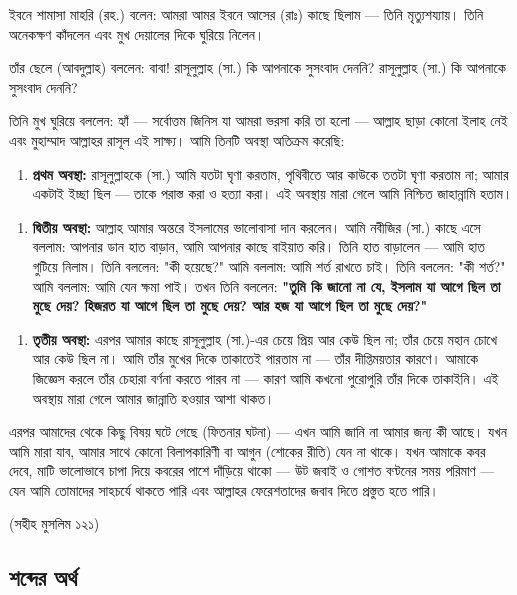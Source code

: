 ইবনে শামাসা মাহরি (রহ.) বলেন: আমরা আমর ইবনে আসের (রাঃ) কাছে ছিলাম — তিনি মৃত্যুশয্যায়। তিনি অনেকক্ষণ কাঁদলেন এবং মুখ দেয়ালের দিকে ঘুরিয়ে নিলেন।

তাঁর ছেলে (আবদুল্লাহ) বললেন: বাবা! রাসূলুল্লাহ (সা.) কি আপনাকে সুসংবাদ দেননি? রাসূলুল্লাহ (সা.) কি আপনাকে সুসংবাদ দেননি?

তিনি মুখ ঘুরিয়ে বললেন: হ্যাঁ — সর্বোত্তম জিনিস যা আমরা ভরসা করি তা হলো — আল্লাহ ছাড়া কোনো ইলাহ নেই এবং মুহাম্মাদ আল্লাহর রাসূল এই সাক্ষ্য। আমি তিনটি অবস্থা অতিক্রম করেছি:

\begin{enumerate}
\item \textbf{প্রথম অবস্থা:} রাসূলুল্লাহকে (সা.) আমি যতটা ঘৃণা করতাম, পৃথিবীতে আর কাউকে ততটা ঘৃণা করতাম না; আমার একটাই ইচ্ছা ছিল — তাকে পরাস্ত করা ও হত্যা করা। এই অবস্থায় মারা গেলে আমি নিশ্চিত জাহান্নামি হতাম।
\end{enumerate}
\begin{enumerate}
\item \textbf{দ্বিতীয় অবস্থা:} আল্লাহ আমার অন্তরে ইসলামের ভালোবাসা দান করলেন। আমি নবীজির (সা.) কাছে এসে বললাম: আপনার ডান হাত বাড়ান, আমি আপনার কাছে বাইয়াত করি। তিনি হাত বাড়ালেন — আমি হাত গুটিয়ে নিলাম। তিনি বললেন: "কী হয়েছে?" আমি বললাম: আমি শর্ত রাখতে চাই। তিনি বললেন: "কী শর্ত?" আমি বললাম: আমি যেন ক্ষমা পাই। তখন তিনি বললেন: \textbf{"তুমি কি জানো না যে, ইসলাম যা আগে ছিল তা মুছে দেয়? হিজরত যা আগে ছিল তা মুছে দেয়? আর হজ যা আগে ছিল তা মুছে দেয়?"}
\end{enumerate}
\begin{enumerate}
\item \textbf{তৃতীয় অবস্থা:} এরপর আমার কাছে রাসূলুল্লাহ (সা.)-এর চেয়ে প্রিয় আর কেউ ছিল না; তাঁর চেয়ে মহান চোখে আর কেউ ছিল না। আমি তাঁর মুখের দিকে তাকাতেই পারতাম না — তাঁর দীপ্তিময়তার কারণে। আমাকে জিজ্ঞেস করলে তাঁর চেহারা বর্ণনা করতে পারব না — কারণ আমি কখনো পুরোপুরি তাঁর দিকে তাকাইনি। এই অবস্থায় মারা গেলে আমার জান্নাতি হওয়ার আশা থাকত।
\end{enumerate}
এরপর আমাদের থেকে কিছু বিষয় ঘটে গেছে (ফিতনার ঘটনা) — এখন আমি জানি না আমার জন্য কী আছে। যখন আমি মারা যাব, আমার সাথে কোনো বিলাপকারিণী বা আগুন (শোকের রীতি) যেন না থাকে। যখন আমাকে কবর দেবে, মাটি ভালোভাবে চাপা দিয়ে কবরের পাশে দাঁড়িয়ে থাকো — উট জবাই ও গোশত বণ্টনের সময় পরিমাণ — যেন আমি তোমাদের সাহচর্যে থাকতে পারি এবং আল্লাহর ফেরেশতাদের জবাব দিতে প্রস্তুত হতে পারি।

(সহীহ মুসলিম ১২১)

\subsection*{শব্দের অর্থ}

